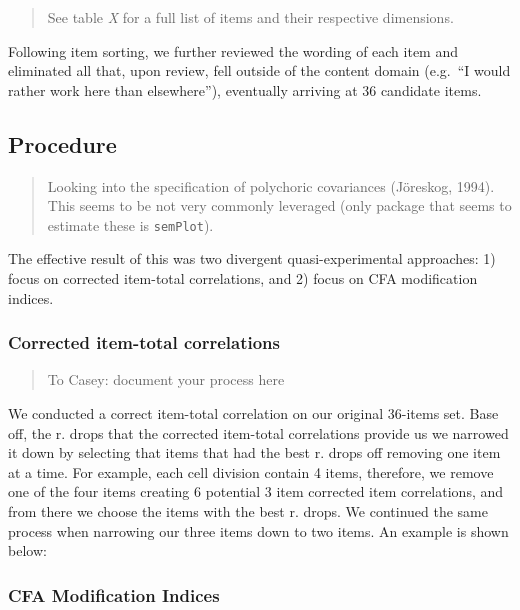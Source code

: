 \documentclass[
  english,
  man]{apa7}
\begin{document}
\begin{quote}
See table \emph{X} for a full list of items and their respective dimensions.
\end{quote}

Following item sorting, we further reviewed the wording of each item and eliminated all that, upon review, fell outside of the content domain (e.g.~``I would rather work here than elsewhere''), eventually arriving at 36 candidate items.

\hypertarget{procedure}{%
\subsection{Procedure}\label{procedure}}

\begin{quote}
Looking into the specification of polychoric covariances (Jöreskog, 1994). This seems to be not very commonly leveraged (only package that seems to estimate these is \texttt{semPlot}).
\end{quote}

The effective result of this was two divergent quasi-experimental approaches: 1) focus on corrected item-total correlations, and 2) focus on CFA modification indices.

\hypertarget{corrected-item-total-correlations}{%
\subsubsection{Corrected item-total correlations}\label{corrected-item-total-correlations}}

\begin{quote}
To Casey: document your process here
\end{quote}

We conducted a correct item-total correlation on our original 36-items set. Base off, the r. drops that the corrected item-total correlations provide us we narrowed it down by selecting that items that had the best r. drops off removing one item at a time. For example, each cell division contain 4 items, therefore, we remove one of the four items creating 6 potential 3 item corrected item correlations, and from there we choose the items with the best r. drops. We continued the same process when narrowing our three items down to two items. An example is shown below:

\hypertarget{cfa-modification-indices}{%
\subsubsection{CFA Modification Indices}\label{cfa-modification-indices}}
\end{document}
